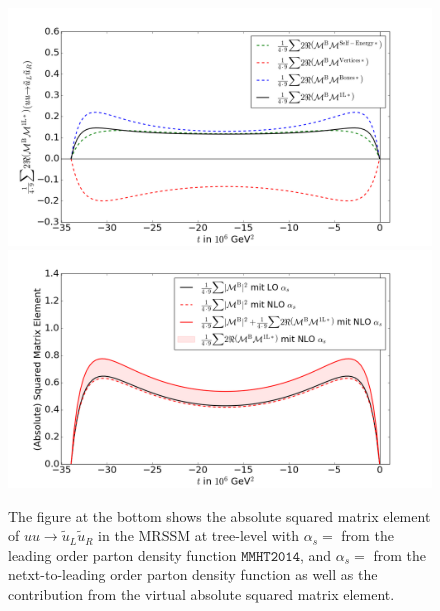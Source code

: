 \begin{figure}[!htpb]
\begin{center}
\includegraphics[scale=.5]{figures/MatrixElement_SE_Vertices_Boxes}
\includegraphics[scale=.5]{figures/MatrixElement.png}
\caption{The figure at the bottom shows the absolute squared matrix element of $uu \to \tilde{u}_L\tilde{u}_R$ in the MRSSM at tree-level with $\alpha_s = $ from the leading order parton density function $\mathtt{MMHT2014}$\cite{Harland-Lang:2014zoa}, and $\alpha_s = $ from the netxt-to-leading order parton density function as well as the contribution from the virtual absolute squared matrix element.}\label{fig:MatrixElement}
\end{center}
\end{figure}